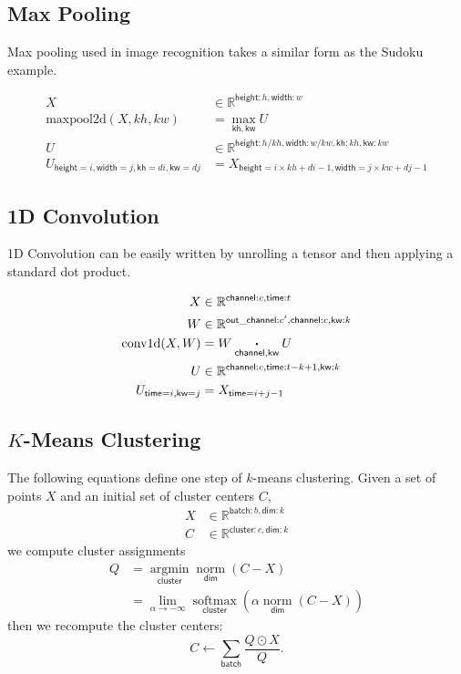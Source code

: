 \documentclass{article}
\newcommand{\name}[1]{\mathsf{#1}}
\newcommand{\nidx}[2]{\name{#1}=#2}
\newcommand{\nset}[2]{\name{#1}:#2}
\newcommand{\ndot}[1]{\mathbin{\mathop{\thinspace\boldsymbol\cdot\thinspace}\limits_{\name{#1}}}}
\newcommand{\nsum}[1]{\mathop{\sum}_{\name{#1}}}
\newcommand{\nfun}[2]{\mathop{\text{#2}}\limits_{\name{#1}}}
\newcommand{\reals}{\mathbb{R}}
\begin{document}
\subsection{Max Pooling}

Max pooling used in image recognition takes a similar form as the Sudoku example.

\begin{align*} 
X &\in \reals^{\nset{height}{h}, \nset{width}{w}} \\
\text{maxpool2d}(X, kh, kw) &=  \nfun{kh, kw}{max} U \\
U &\in \reals^{{\nset{height}{h / kh}, \nset{width}{w / kw}, \nset{kh}{kh}, \nset{kw}{kw}}} \\
U_{\nidx{height}{i}, \nidx{width}{j}, \nidx{kh}{di}, \nidx{kw}{dj}} & = X_{\nidx{height}{i \times kh + di -1}, \nidx{width}{j \times kw + dj -1}}  
\end{align*}



\subsection{1D Convolution}

1D Convolution can be easily written by unrolling a tensor and then
applying a standard dot product.

\begin{align*} 
X &\in \reals^{{\nset{channel}{c}, \nset{time}{t}}}  \\
W &\in \reals^{{\nset{out\_channel}{c'}, \nset{channel}{c}, \nset{kw}{k}}}  \\
\text{conv1d}(X, W) &= W \ndot{channel, kw} U \\
U &\in \reals^{{\nset{channel}{c}, \nset{time}{t-k +1}, \nset{kw}{k}}}  \\
U_{\nidx{time}{i}, \nidx{kw}{j}} & = X_{\nidx{time}{i+j - 1}}  
\end{align*} 


\subsection{$K$-Means Clustering}

The following equations define one step of $k$-means clustering. Given a set of points $X$ and an initial set of cluster centers $C$,
\begin{align*} 
X &\in \reals^{\nset{batch}{b}, \nset{dim}{k}} \\
C &\in \reals^{\nset{cluster}{c}, \nset{dim}{k}}
\end{align*}
we compute cluster assignments
\begin{align*}
Q &= \nfun{cluster}{argmin} \nfun{dim}{norm}(C-X) \\
  &= \lim_{\alpha \rightarrow -\infty} \nfun{cluster}{softmax} \left(\alpha \nfun{dim}{norm}(C-X)\right)
\end{align*}
then we recompute the cluster centers:
\begin{equation*}
C \leftarrow \nsum{batch} \frac{Q \odot X}{Q}.
\end{equation*}
\end{document}
